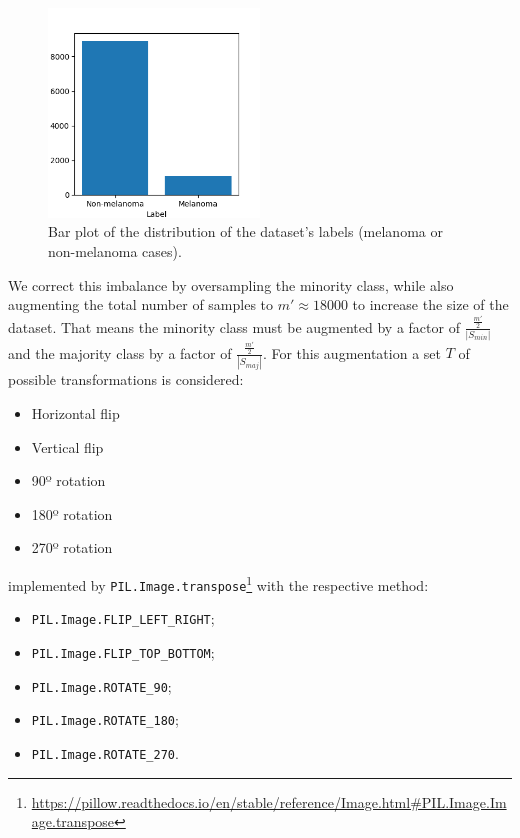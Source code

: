 \begin{figure}[ht]
    \centering
    \includegraphics[width=0.5\textwidth]{figs/data_barplot.png}
    \caption{Bar plot of the distribution of the dataset's labels (melanoma or non-melanoma cases).}
    \label{fig:classimbalance}
\end{figure}

We correct this imbalance by oversampling the minority class, while also augmenting the total number of samples to $m' \approx 18000$ to increase the size of the dataset. That means the minority class must be augmented by a factor of $\frac{\frac{m'}{2}}{|S_{min}|}$ and the majority class by a factor of $\frac{\frac{m'}{2}}{|S_{maj}|}$. For this augmentation a set $T$ of possible transformations is considered:

\begin{itemize}
    \item Horizontal flip
    \item Vertical flip
    \item 90º rotation
    \item 180º rotation
    \item 270º rotation
\end{itemize}

implemented by \verb|PIL.Image.transpose|\footnote{\url{https://pillow.readthedocs.io/en/stable/reference/Image.html\#PIL.Image.Image.transpose}} with the respective method:

\begin{itemize}
    \item \verb|PIL.Image.FLIP_LEFT_RIGHT|;
    \item \verb|PIL.Image.FLIP_TOP_BOTTOM|;
    \item \verb|PIL.Image.ROTATE_90|;
    \item \verb|PIL.Image.ROTATE_180|;
    \item \verb|PIL.Image.ROTATE_270|.
\end{itemize}

